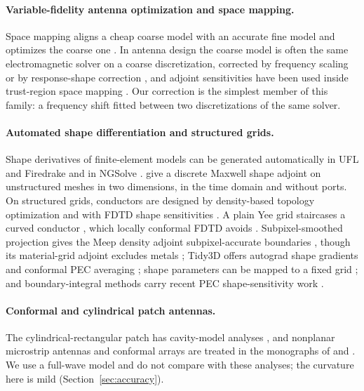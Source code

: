 \documentclass{anvil-paper}
\begin{document}
\paragraph{Variable-fidelity antenna optimization and space mapping.}
Space mapping aligns a cheap coarse model with an accurate fine model and
optimizes the coarse one \citep{bandler1994space,bandler2004space,koziel2006framework}.
In antenna design the coarse model is often the same electromagnetic solver
on a coarse discretization, corrected by frequency scaling or by
response-shape correction \citep{koziel2010sprp,koziel2014antenna}, and
adjoint sensitivities have been used inside trust-region space mapping
\citep{koziel2013reliable}. Our correction is the simplest member of this
family: a frequency shift fitted between two discretizations of the same
solver.

\paragraph{Automated shape differentiation and structured grids.}
Shape derivatives of finite-element models can be generated automatically in
UFL and Firedrake \citep{ham2019automated,dokken2020,paganini2021fireshape}
and in NGSolve \citep{gangl2021fully}. \citet{wang2011} give a discrete
Maxwell shape adjoint on unstructured meshes in two dimensions, in the time
domain and without ports. On structured grids, conductors are designed by
density-based topology optimization
\citep{erentok2011topology,hassan2014topology,hassan2014patch} and with FDTD
shape sensitivities \citep{nikolova2004sensitivity,nikolova2006scattering}.
A plain Yee grid staircases a curved conductor
\citep{cangellaris1991analysis,haggblad2014accuracy}, which locally
conformal FDTD avoids
\citep{dey1997locally,mittra2000conformal,zagorodnov2003uniformly,benkler2006new}.
Subpixel-smoothed projection gives the Meep density adjoint
subpixel-accurate boundaries \citep{hammond2025unifying,romano2026ssp2},
though its material-grid adjoint excludes metals \citep{meepadjointdocs};
Tidy3D offers autograd shape gradients and conformal PEC averaging
\citep{tidy3dautograd}; shape parameters can be mapped to a fixed grid
\citep{hooten2025,liu2024imagerep}; and boundary-integral methods carry
recent PEC shape-sensitivity work
\citep{takahashi2025tdbie,arens2026tubular,balouchev2024balun}.

\paragraph{Conformal and cylindrical patch antennas.}
The cylindrical-rectangular patch has cavity-model analyses
\citep{krowne1983cylindrical,luk1989cylindrical}, and nonplanar microstrip
antennas and conformal arrays are treated in the monographs of
\citet{wong1999nonplanar} and \citet{josefsson2006conformal}. We use a
full-wave model and do not compare with these analyses; the curvature here
is mild (Section~\ref{sec:accuracy}).
\end{document}
